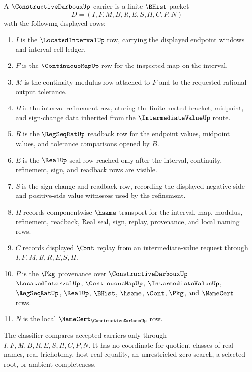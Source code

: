 \begin{definition}
\label{def:constructive-darboux-carrier}
A $\ConstructiveDarbouxUp$ carrier is a finite $\BHist$ packet
$$
D=(I,F,M,B,R,E,S,H,C,P,N)
$$
with the following displayed rows:
\begin{enumerate}
\item $I$ is the $\LocatedIntervalUp$ row, carrying the displayed endpoint windows and interval-cell ledger.
\item $F$ is the $\ContinuousMapUp$ row for the inspected map on the interval.
\item $M$ is the continuity-modulus row attached to $F$ and to the requested rational output tolerance.
\item $B$ is the interval-refinement row, storing the finite nested bracket, midpoint, and sign-change data inherited from the $\IntermediateValueUp$ route.
\item $R$ is the $\RegSeqRatUp$ readback row for the endpoint values, midpoint values, and tolerance comparisons opened by $B$.
\item $E$ is the $\RealUp$ seal row reached only after the interval, continuity, refinement, sign, and readback rows are visible.
\item $S$ is the sign-change and readback row, recording the displayed negative-side and positive-side value witnesses used by the refinement.
\item $H$ records componentwise $\hsame$ transport for the interval, map, modulus, refinement, readback, Real seal, sign, replay, provenance, and local naming rows.
\item $C$ records displayed $\Cont$ replay from an intermediate-value request through $I,F,M,B,R,E,S,H$.
\item $P$ is the $\Pkg$ provenance over $\ConstructiveDarbouxUp$, $\LocatedIntervalUp$, $\ContinuousMapUp$, $\IntermediateValueUp$, $\RegSeqRatUp$, $\RealUp$, $\BHist$, $\hsame$, $\Cont$, $\Pkg$, and $\NameCert$ rows.
\item $N$ is the local $\NameCert_{\ConstructiveDarbouxUp}$ row.
\end{enumerate}
The classifier compares accepted carriers only through $I,F,M,B,R,E,S,H,C,P,N$. It has no coordinate for quotient classes of real names, real trichotomy, host real equality, an unrestricted zero search, a selected root, or ambient completeness.
\end{definition}

